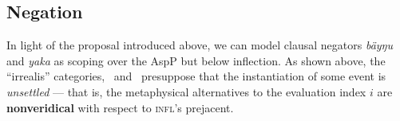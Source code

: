 %	
%






\subsection{Negation}

In light of the proposal introduced above, we can model clausal negators \textit{bäyŋu} and \textit{yaka} as scoping over the AspP but below inflection. As shown above, the ``irrealis'' categories, \II~and \IV~presuppose that the instantiation of some event is \textit{unsettled} --- that is, the metaphysical alternatives to the evaluation index $ i $ are \textbf{nonveridical} with respect to \textsc{infl}'s prejacent. 

